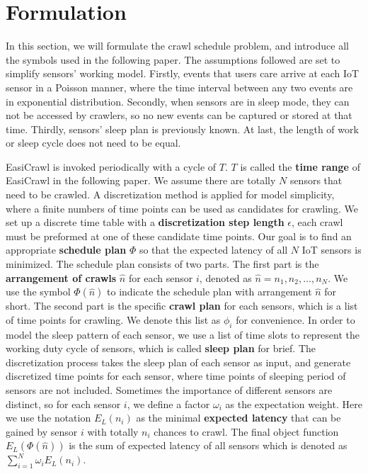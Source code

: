 \documentclass[conference]{IEEEtran}
\begin{document}
\section{Formulation}\label{formulation}

In this section, we will formulate the crawl schedule problem, and introduce all the symbols used in the following paper. 
The assumptions followed are set to simplify sensors' working model.
Firstly, events that users care arrive at each IoT sensor in a Poisson manner, where the time interval between any two events are in exponential distribution. 
Secondly, when sensors are in sleep mode, they can not be accessed by crawlers, so no new events can be captured or stored at that time.
Thirdly, sensors' sleep plan is previously known.
At last, the length of work or sleep cycle does not need to be equal.

EasiCrawl is invoked periodically with a cycle of $T$.
$T$ is called the \textbf{time range} of EasiCrawl in the following paper.
We assume there are totally $N$ sensors that need to be crawled.
A discretization method is applied for model simplicity, where a finite numbers of time points can be used as candidates for crawling.
We set up a discrete time table with a \textbf{discretization step length} $\epsilon$, each crawl must be preformed at one of these candidate time points.
Our goal is to find an appropriate \textbf{schedule plan} $\Phi$ so that the expected latency of all $N$ IoT sensors is minimized. 
The schedule plan consists of two parts. 
The first part is the \textbf{arrangement of crawls} $\hat{n}$ for each sensor $i$, denoted as $\hat{n}=n_1,n_2,\ldots,n_{N}$. 
We use the symbol $\Phi(\hat{n})$ to indicate the schedule plan with arrangement $\hat{n}$ for short.
The second part is the specific \textbf{crawl plan} for each sensors, which is a list of time points for crawling. 
We denote this list as $\phi_{i}$ for convenience.
In order to model the sleep pattern of each sensor, we use a list of time slots to represent the working duty cycle of sensors, which is called \textbf{sleep plan} for brief. 
The discretization process takes the sleep plan of each sensor as input, and generate discretized time points for each sensor, where time points of sleeping period of sensors are not included.
Sometimes the importance of different sensors are distinct, so for each sensor $i$, we define a factor $\omega_i$ as the expectation weight. 
Here we use the notation $E_{L}(n_{i})$ as the minimal \textbf{expected latency} that can be gained by sensor $i$ with totally $n_i$ chances to crawl.
The final object function $E_L(\Phi(\hat{n}))$ is the sum of expected latency of all sensors which is denoted as $\sum_{i=1}^{N} \omega_i E_{L}(n_{i})$.
\end{document}
